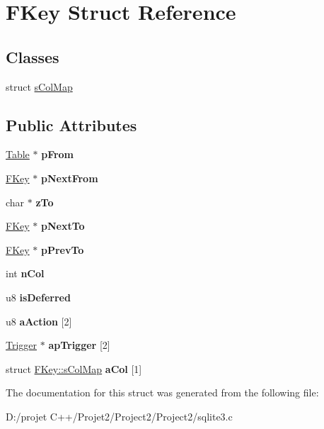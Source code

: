 \hypertarget{struct_f_key}{}\section{F\+Key Struct Reference}
\label{struct_f_key}
\subsection*{Classes}
\begin{DoxyCompactItemize}
\item 
struct \mbox{\hyperlink{struct_f_key_1_1s_col_map}{s\+Col\+Map}}
\end{DoxyCompactItemize}
\subsection*{Public Attributes}
\begin{DoxyCompactItemize}
\item 
\mbox{\label{struct_f_key_a6d476f3fbfa75a19c5c5a9edec4e79eb}} 
\mbox{\hyperlink{struct_table}{Table}} $\ast$ {\bfseries p\+From}
\item 
\mbox{\label{struct_f_key_ac64ff66b30167715c8822a74c2809075}} 
\mbox{\hyperlink{struct_f_key}{F\+Key}} $\ast$ {\bfseries p\+Next\+From}
\item 
\mbox{\label{struct_f_key_a1eac10bab38a0ac9f88306fbbabbe5d6}} 
char $\ast$ {\bfseries z\+To}
\item 
\mbox{\label{struct_f_key_ac29b26999113602e7e3921bf07643c04}} 
\mbox{\hyperlink{struct_f_key}{F\+Key}} $\ast$ {\bfseries p\+Next\+To}
\item 
\mbox{\label{struct_f_key_a56189e420e91df86513e6895db518eca}} 
\mbox{\hyperlink{struct_f_key}{F\+Key}} $\ast$ {\bfseries p\+Prev\+To}
\item 
\mbox{\label{struct_f_key_a611e3223f3f434e0a635e036dc100cbb}} 
int {\bfseries n\+Col}
\item 
\mbox{\label{struct_f_key_ab742714b17f2c13353837e1fdde51cc7}} 
u8 {\bfseries is\+Deferred}
\item 
\mbox{\label{struct_f_key_a68a08f58294bf845e9c77d785499d222}} 
u8 {\bfseries a\+Action} \mbox{[}2\mbox{]}
\item 
\mbox{\label{struct_f_key_a9ce15cb27b675836bc714ab18fd8a008}} 
\mbox{\hyperlink{struct_trigger}{Trigger}} $\ast$ {\bfseries ap\+Trigger} \mbox{[}2\mbox{]}
\item 
\mbox{\label{struct_f_key_a5b230bc6c10a67f432ed7d5ebc92bcd2}} 
struct \mbox{\hyperlink{struct_f_key_1_1s_col_map}{F\+Key\+::s\+Col\+Map}} {\bfseries a\+Col} \mbox{[}1\mbox{]}
\end{DoxyCompactItemize}


The documentation for this struct was generated from the following file\+:\begin{DoxyCompactItemize}
\item 
D\+:/projet C++/\+Projet2/\+Project2/\+Project2/sqlite3.\+c\end{DoxyCompactItemize}
